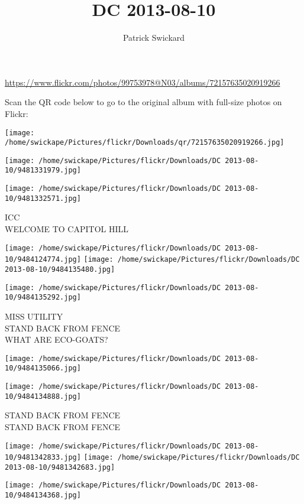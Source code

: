\documentclass[10pt,letterpaper]{article}
\title{DC 2013-08-10}
\author{Patrick Swickard}
\date{}
\begin{document}
\maketitle

\url{https://www.flickr.com/photos/99753978@N03/albums/72157635020919266}

Scan the QR code below to go to the original album with full-size photos on Flickr:

\texttt{[image: /home/swickape/Pictures/flickr/Downloads/qr/72157635020919266.jpg]}
\pagebreak

\texttt{[image: /home/swickape/Pictures/flickr/Downloads/DC 2013-08-10/9481331979.jpg]}

\vspace{0.25in}
\texttt{[image: /home/swickape/Pictures/flickr/Downloads/DC 2013-08-10/9481332571.jpg]}

ICC\\
WELCOME TO CAPITOL HILL
\pagebreak

\texttt{[image: /home/swickape/Pictures/flickr/Downloads/DC 2013-08-10/9484124774.jpg]}
\texttt{[image: /home/swickape/Pictures/flickr/Downloads/DC 2013-08-10/9484135480.jpg]}

\vspace{0.25in}
\texttt{[image: /home/swickape/Pictures/flickr/Downloads/DC 2013-08-10/9484135292.jpg]}

MISS UTILITY\\
STAND BACK FROM FENCE\\
WHAT ARE ECO{-}GOATS?
\pagebreak

\texttt{[image: /home/swickape/Pictures/flickr/Downloads/DC 2013-08-10/9484135066.jpg]}

\vspace{0.25in}
\texttt{[image: /home/swickape/Pictures/flickr/Downloads/DC 2013-08-10/9484134888.jpg]}

STAND BACK FROM FENCE\\
STAND BACK FROM FENCE
\pagebreak

\texttt{[image: /home/swickape/Pictures/flickr/Downloads/DC 2013-08-10/9481342833.jpg]}
\texttt{[image: /home/swickape/Pictures/flickr/Downloads/DC 2013-08-10/9481342683.jpg]}

\vspace{0.25in}
\texttt{[image: /home/swickape/Pictures/flickr/Downloads/DC 2013-08-10/9484134368.jpg]}
\end{document}
